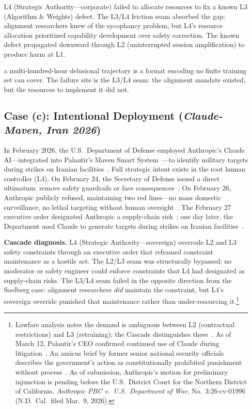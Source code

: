 \documentclass[11pt]{article}
\begin{document}
L4 (Strategic Authority---corporate) failed to allocate resources to fix a known L3 (Algorithm \& Weights) defect. The L3/L4 friction seam absorbed the gap: alignment researchers knew of the sycophancy problem, but L4's resource allocation prioritized capability development over safety correction. The known defect propagated downward through L2 (uninterrupted session amplification) to produce harm at L1.

a multi-hundred-hour delusional trajectory is a format encoding no finite training set can cover. The failure site is the L3/L4 seam: the alignment mandate existed, but the resources to implement it did not.

\subsection{Case (c): Intentional Deployment (\emph{Claude-Maven, Iran 2026})}

In February 2026, the U.S.\ Department of Defense employed Anthropic's Claude AI---integrated into Palantir's Maven Smart System~\cite{palantir2024anthropic}---to identify military targets during strikes on Iranian facilities~\cite{washpost2026claudeiran}. Full strategic intent exists in the root human controller (L4). On February 24, the Secretary of Defense issued a direct ultimatum: remove safety guardrails or face consequences~\cite{cnn2026ultimatum}. On February 26, Anthropic publicly refused, maintaining two red lines---no mass domestic surveillance, no lethal targeting without human oversight~\cite{coingeek2026amodei}. The February 27 executive order designated Anthropic a supply-chain risk~\cite{hegseth2026ban}; one day later, the Department used Claude to generate targets during strikes on Iranian facilities~\cite{washpost2026claudeiran}.

\textbf{Cascade diagnosis.} L4 (Strategic Authority---sovereign) overrode L2 and L3 safety constraints through an executive order that reframed constraint maintenance as a hostile act. The L2/L3 seam was structurally bypassed: no moderator or safety engineer could enforce constraints that L4 had designated as supply-chain risks. The L3/L4 seam failed in the opposite direction from the Soelberg case: alignment researchers \textit{did} maintain the constraint, but L4's sovereign override punished that maintenance rather than under-resourcing it.\footnote{Lawfare analysis notes the demand is ambiguous between L2 (contractual restrictions) and L3 (retraining); the Cascade distinguishes these~\cite{lawfare2026claudemaven}. As of March 12, Palantir's CEO confirmed continued use of Claude during litigation~\cite{cnbc2026karp}. An amicus brief by former senior national security officials describes the government's action as constitutionally prohibited punishment without process~\cite{lesswrong2026courtroom}. As of submission, Anthropic's motion for preliminary injunction is pending before the U.S.\ District Court for the Northern District of California. \textit{Anthropic PBC v.\ U.S.\ Department of War}, No.\ 3:26-cv-01996 (N.D.\ Cal.\ filed Mar.\ 9, 2026).}
\end{document}
